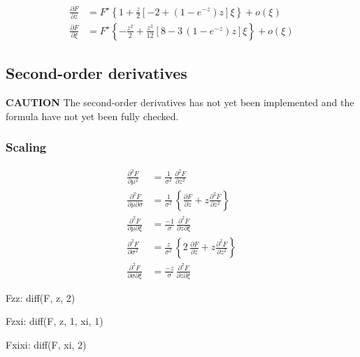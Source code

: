 {\color{red}
\begin{align*}
  \frac{\partial F}{\partial z}
  &= F^\star \left\{ 1 + \frac{z}{2} \left[ -2 + (1 -e^{-z}) z \right] \xi \right\} + o(\xi) \\
  \frac{\partial F}{\partial \xi}
  &= F^\star
    \left\{-\frac{z^2}{2}
    + \frac{z^3}{12} \left[8 - 3 \, (1 -e^{-z}) z \right] \xi \right\}
    + o(\xi)
\end{align*}
}

\subsection{Second-order derivatives}

\textbf{CAUTION} The second-order derivatives has not yet been implemented and
the formula have not yet been fully checked.

\subsubsection*{Scaling}

{\color{red}
\begin{align*}
  \frac{\partial^2 F}{\partial \mu^2}
  &= \frac{1}{\sigma^2} \,
    \frac{\partial^2 F}{\partial z^2} \\
  \frac{\partial^2 F}{\partial \mu \partial \sigma}
  &= \frac{1}{\sigma^2} \,
    \left\{
    \frac{\partial F}{\partial z} +
    z \frac{\partial^2 F}{\partial z^2}
    \right\} \\
  \frac{\partial^2 F}{\partial \mu \partial \xi}
  &= \frac{-1}{\sigma} \,
    \frac{\partial^2 F}{\partial z \partial \xi}\\
  \frac{\partial^2 F}{\partial \sigma^2}
  &= \frac{z}{\sigma^2} \,
    \left\{2 \, \frac{\partial F}{\partial z} + z
    \frac{\partial^2 F}{\partial z^2} \right\} \\
  \frac{\partial^2 F}{\partial \sigma \partial \xi}
  &= \frac{-z}{\sigma} \,
    \frac{\partial^2 F}{\partial z \partial \xi} 
\end{align*}
}


\begin{maxima}
 Fzz: diff(F, z, 2)
\end{maxima}%

\begin{maxima}
  Fzxi: diff(F, z, 1, xi, 1)
\end{maxima}%

\begin{maxima}
  Fxixi: diff(F, xi, 2) 
\end{maxima}


